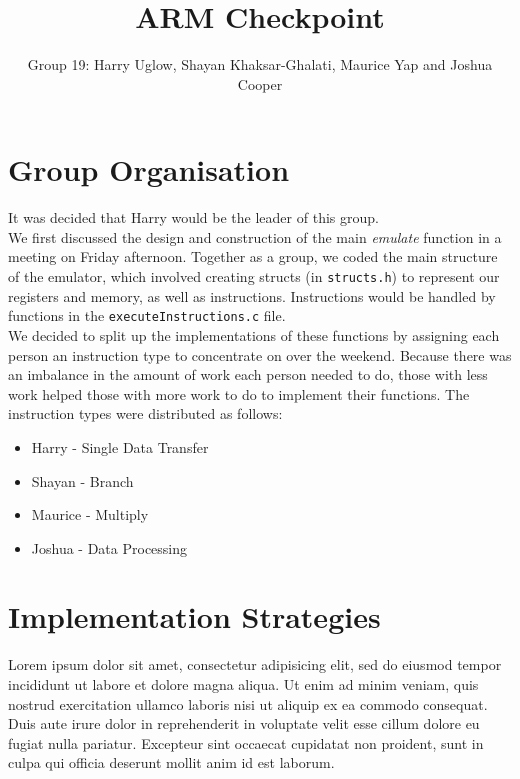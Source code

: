 \documentclass[11pt]{article}
\begin{document}
\title{ARM Checkpoint}
\author{Group 19: Harry Uglow, Shayan Khaksar-Ghalati, Maurice Yap and Joshua Cooper}

\maketitle

\section{Group Organisation}

It was decided that Harry would be the leader of this group.\\

We first discussed the design and construction of the main \textit{emulate} function in a meeting on Friday afternoon. Together as a group, we coded the main structure of the emulator, which involved creating structs (in \texttt{structs.h}) to represent our registers and memory, as well as instructions. Instructions would be handled by functions in the \texttt{executeInstructions.c} file.\\

We decided to split up the implementations of these functions by assigning each person an instruction type to concentrate on over the weekend. Because there was an imbalance in the amount of work each person needed to do, those with less work helped those with more work to do to implement their functions. The instruction types were distributed as follows:\\
\begin{itemize}
\item Harry - Single Data Transfer
\item Shayan - Branch
\item Maurice - Multiply
\item Joshua - Data Processing
\end{itemize}

\section{Implementation Strategies}

Lorem ipsum dolor sit amet, consectetur adipisicing elit, sed do eiusmod tempor
incididunt ut labore et dolore magna aliqua. Ut enim ad minim veniam, quis
nostrud exercitation ullamco laboris nisi ut aliquip ex ea commodo consequat.
Duis aute irure dolor in reprehenderit in voluptate velit esse cillum dolore eu
fugiat nulla pariatur. Excepteur sint occaecat cupidatat non proident, sunt in
culpa qui officia deserunt mollit anim id est laborum.
\end{document}
